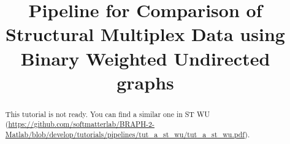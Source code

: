 \documentclass[justified]{tufte-handout}
\title{Pipeline for Comparison of Structural Multiplex Data using Binary Weighted Undirected graphs}
\begin{document}
\maketitle

\begin{abstract}
\noindent
This tutorial is not ready. You can find a similar one in ST WU (\url{https://github.com/softmatterlab/BRAPH-2-Matlab/blob/develop/tutorials/pipelines/tut_a_st_wu/tut_a_st_wu.pdf}).
\end{abstract}
\end{document}
